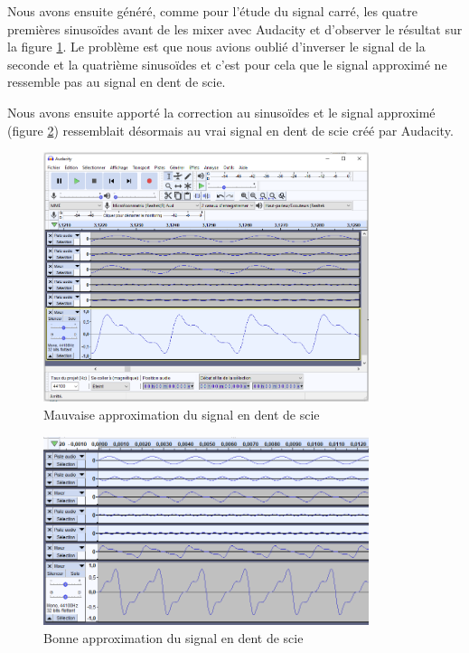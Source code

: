 \documentclass[a4paper]{article}
\begin{document}

Nous avons ensuite généré, comme pour l'étude du signal carré, les quatre premières sinusoïdes avant de les mixer avec Audacity et d'observer le résultat sur la figure \ref{fig:DentScie015}. Le problème est que nous avions oublié d'inverser le signal de la seconde et la quatrième sinusoïdes et c'est pour cela que le signal approximé ne ressemble pas au signal en dent de scie.

Nous avons ensuite apporté la correction au sinusoïdes et le signal approximé (figure \ref{fig:DentScie017}) ressemblait désormais au vrai signal en dent de scie créé par Audacity.


\begin{figure}[H]
    \centering
    \includegraphics[width=0.85\textwidth]{images/DentScie015.PNG}
    \caption{Mauvaise approximation du signal en dent de scie}
    \label{fig:DentScie015}
\end{figure}

\begin{figure}[H]
    \centering
    \includegraphics[width=0.85\textwidth]{images/DentScie017.PNG}
    \caption{Bonne approximation du signal en dent de scie}
    \label{fig:DentScie017}
\end{figure}
\end{document}
